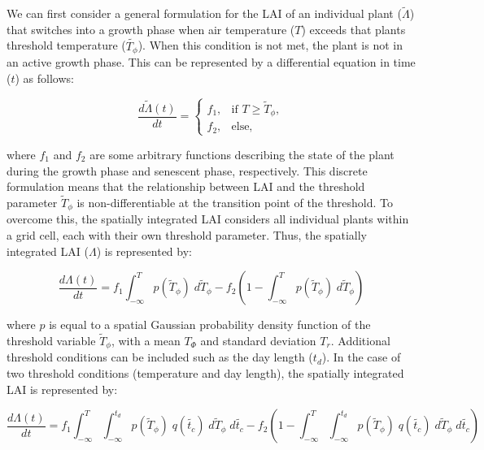 \documentclass[twoside,10pt]{report}
\begin{document}
We can first consider a general formulation for the LAI of an individual plant ($\tilde{\Lambda}$) that switches into a growth phase when air temperature ($T$) exceeds that plants threshold temperature ($\tilde{T_{\phi}}$). When this condition is not met, the plant is not in an active growth phase. This can be represented by a differential equation in time ($t$) as follows:

\begin{equation}
\label{e:phenology_lai_discrete}
    \frac{d\tilde{\Lambda}(t)}{dt} = 
    \begin{cases}
    f_1,  &  \text{if }T \geq \tilde{T}_{\phi},\\
    f_2, &  \text{else, }
    \end{cases}
\end{equation}

where $f_1$ and $f_2$ are some arbitrary functions describing the state of the plant during the growth phase and senescent phase, respectively. This discrete formulation means that the relationship between LAI and the threshold parameter $\tilde{T}_{\phi}$ is non-differentiable at the transition point of the threshold. To overcome this, the spatially integrated LAI considers all individual plants within a grid cell, each with their own threshold parameter. Thus, the spatially integrated LAI ($\Lambda$) is represented by:

\begin{equation}
\label{e:phenology_lai_integral_temp}
    \frac{d\Lambda(t)}{dt} = f_1 \int_{-\infty}^{T} p(\tilde{T}_{\phi}) \; d\tilde{T}_{\phi} - f_2 \left( 1 - \int_{-\infty}^{T} p(\tilde{T}_{\phi}) \; d\tilde{T}_{\phi} \right)
\end{equation}

where $p$ is equal to a spatial Gaussian probability density function of the threshold variable $\tilde{T}_{\phi}$, with a mean $T_{\Phi}$ and standard deviation $T_r$. Additional threshold conditions can be included such as the day length ($t_d$). In the case of two threshold conditions (temperature and day length), the spatially integrated LAI is represented by:

\begin{equation}
\label{e:phenology_lai_integral_tempdaylength}
    \frac{d\Lambda(t)}{dt} = f_1 \int_{-\infty}^{T} \int_{-\infty}^{t_d} p(\tilde{T}_{\phi}) \; q(\tilde{t_{c}}) \; d\tilde{T}_{\phi} \; d\tilde{t_{c}} - f_2 \left( 1 - \int_{-\infty}^{T} \int_{-\infty}^{t_d} p(\tilde{T}_{\phi}) \; q(\tilde{t_{c}}) \; d\tilde{T}_{\phi} \; d\tilde{t_{c}} \right)
\end{equation}
\end{document}
